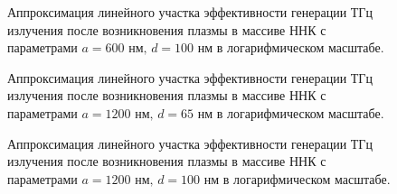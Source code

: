 \documentclass[a4paper,14pt,russian]{extreport}
\begin{document}
				\begin{figure}[h]
					\caption{Аппроксимация линейного участка эффективности генерации ТГц излучения после возникновения плазмы в массиве ННК с параметрами $a = 600 \text{ нм, } d = 100 \text{ нм}$ в логарифмическом масштабе.}
				\label{ris:linear600100}
				\end{figure}
				\begin{figure}[h]
					\caption{Аппроксимация линейного участка эффективности генерации ТГц излучения после возникновения плазмы в массиве ННК с параметрами $a = 1200 \text{ нм, } d = 65 \text{ нм}$ в логарифмическом масштабе.}
				\label{ris:linear120065}
				\end{figure}
				\begin{figure}[H]
					\caption{Аппроксимация линейного участка эффективности генерации ТГц излучения после возникновения плазмы в массиве ННК с параметрами $a = 1200 \text{ нм, } d = 100 \text{ нм}$ в логарифмическом масштабе.}
				\label{ris:linear1200100}
				\end{figure}
\end{document}
